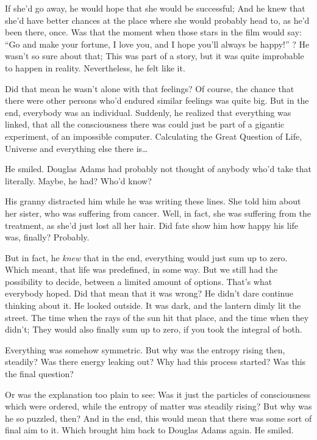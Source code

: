 If she'd go away, he would hope that she would be successful; And he knew that she'd have better chances at the place where she would probably head to, as he'd been there, once. 
Was that the moment when those stars in the film would say: \enquote{Go and make your fortune, I love you, and I hope you'll always be happy!} ?
He wasn't so sure about that; This was part of a story, but it was quite improbable to happen in reality. 
Nevertheless, he felt like it.

Did that mean he wasn't alone with that feelings?
Of course, the chance that there were other persons who'd endured similar feelings was quite big. 
But in the end, everybody was an individual. 
Suddenly, he realized that everything was linked, that all the consciousness there was could just be part of a gigantic experiment, of an impossible computer. 
Calculating the Great Question of Life, Universe and everything else there is\ldots

He smiled.
Douglas Adams had probably not thought of anybody who'd take that literally. 
Maybe, he had?
Who'd know?

His granny distracted him while he was writing these lines. 
She told him about her sister, who was suffering from cancer. 
Well, in fact, she was suffering from the treatment, as she'd just lost all her hair. 
Did fate show him how happy his life was, finally?
Probably.

But in fact, he \emph{knew} that in the end, everything would just sum up to zero. 
Which meant, that life was predefined, in some way. But we still had the possibility to decide, between a limited amount of options. 
That's what everybody hoped. 
Did that mean that it was wrong?
He didn't dare continue thinking about it. 
He looked outside. It was dark, and the lantern dimly lit the street. The time when the rays of the sun hit that place, and the time when they didn't; They would also finally sum up to zero, if you took the integral of both.

Everything was somehow symmetric. 
But why was the entropy rising then, steadily?
Was there energy leaking out?
Why had this process started?
Was this the final question?

Or was the explanation too plain to see: Was it just the particles of consciousness which were ordered, while the entropy of matter was steadily rising?
But why was he so puzzled, then?
And in the end, this would mean that there was some sort of final aim to it. 
Which brought him back to Douglas Adams again. 
He smiled.

